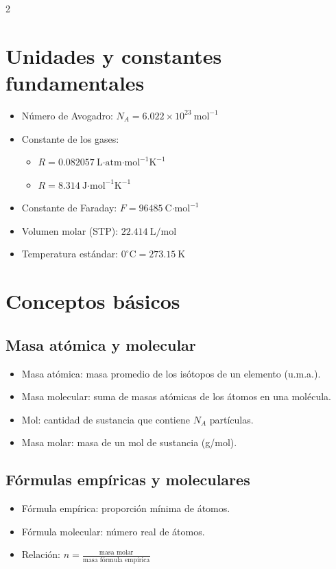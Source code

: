 \documentclass[12pt]{article}
\begin{document}
\begin{multicols}{2}
\raggedcolumns

\section*{Unidades y constantes fundamentales}
\begin{itemize}[leftmargin=*]
    \item Número de Avogadro: $N_A = 6.022 \times 10^{23} \ \text{mol}^{-1}$
    \item Constante de los gases: 
    \begin{itemize}
        \item $R = 0.082057 \ \text{L·atm·mol}^{-1}\text{K}^{-1}$
        \item $R = 8.314 \ \text{J·mol}^{-1}\text{K}^{-1}$
    \end{itemize}
    \item Constante de Faraday: $F = 96485 \ \text{C·mol}^{-1}$
    \item Volumen molar (STP): $22.414 \ \text{L/mol}$
    \item Temperatura estándar: $0^\circ\text{C} = 273.15 \ \text{K}$
\end{itemize}

\section*{Conceptos básicos}
\subsection*{Masa atómica y molecular}
\begin{itemize}[leftmargin=*]
    \item Masa atómica: masa promedio de los isótopos de un elemento (u.m.a.).
    \item Masa molecular: suma de masas atómicas de los átomos en una molécula.
    \item Mol: cantidad de sustancia que contiene $N_A$ partículas.
    \item Masa molar: masa de un mol de sustancia (g/mol).
\end{itemize}

\subsection*{Fórmulas empíricas y moleculares}
\begin{itemize}[leftmargin=*]
    \item Fórmula empírica: proporción mínima de átomos.
    \item Fórmula molecular: número real de átomos.
    \item Relación: $n = \frac{\text{masa molar}}{\text{masa fórmula empírica}}$
\end{itemize}


\end{multicols}
\end{document}
